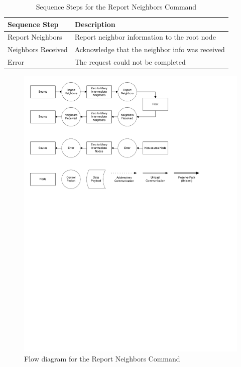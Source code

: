 \begin{table}
	\begin{center}
		\setlength{\extrarowheight}{1.5pt}
		\caption{Sequence Steps for the Report Neighbors Command}
		\vspace{0.1cm}
		\begin{tabular}{|l|l|}
			\hline
			\textbf{Sequence Step} & \textbf{Description} \\
			\hline
			\hline
			Report Neighbors & Report neighbor information to the root node \\
			\hline
			Neighbors Received & Acknowledge that the neighbor info was received \\
			\hline
			Error & The request could not be completed \\
			\hline
		\end{tabular}
		\label{tab:protocol:report_neighbors}
	\end{center}
\end{table}

\begin{figure}[ptb]
	\begin{centering}
		\includegraphics[scale=0.75]{Protocol/Figures/protocol-report_neighbors.pdf}
		\caption{Flow diagram for the Report Neighbors Command}
		\label{fig:protocol:report_neighbors}
	\end{centering}
\end{figure}

